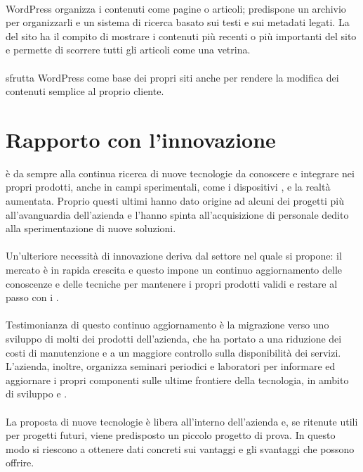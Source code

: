    \paragraph*{} WordPress organizza i contenuti come pagine o articoli; predispone un archivio per organizzarli e un sistema di ricerca basato sui testi e sui metadati legati. La  del sito ha il compito di mostrare i contenuti più recenti o più importanti del sito e permette di scorrere tutti gli articoli come una vetrina.
   \paragraph*{}
   \nomeAzienda{} sfrutta WordPress come base dei propri siti anche per rendere la modifica dei contenuti semplice al proprio cliente.

\section{Rapporto con l'innovazione}
\nomeAzienda{} è da sempre alla continua ricerca di nuove tecnologie da conoscere e integrare nei propri prodotti, anche in campi sperimentali, come i dispositivi ,  e la realtà aumentata. Proprio questi ultimi hanno dato origine ad alcuni dei progetti più all'avanguardia dell'azienda e l'hanno spinta all'acquisizione di personale dedito alla sperimentazione di nuove soluzioni.
\paragraph*{}
Un'ulteriore necessità di innovazione deriva dal settore nel quale \nomeAzienda{} si propone: il mercato è in rapida crescita e questo impone un continuo aggiornamento delle conoscenze e delle tecniche per mantenere i propri prodotti validi e restare al passo con i .
\paragraph*{}
Testimonianza di questo continuo aggiornamento è la migrazione verso uno sviluppo   di molti dei prodotti dell'azienda, che ha portato a una riduzione dei costi di manutenzione e a un maggiore controllo sulla disponibilità dei servizi. L'azienda, inoltre, organizza seminari periodici e laboratori per informare ed aggiornare i propri componenti sulle ultime frontiere della tecnologia, in ambito di sviluppo e .
\paragraph*{}
La proposta di nuove tecnologie è libera all'interno dell'azienda e, se ritenute utili per progetti futuri, viene predisposto un piccolo progetto di prova. In questo modo si riescono a ottenere dati concreti sui vantaggi e gli svantaggi che possono offrire.

